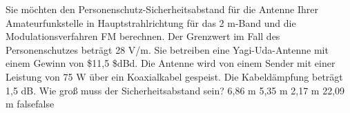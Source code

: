     {Sie möchten den Personenschutz-Sicherheitsabstand für die Antenne Ihrer Amateurfunkstelle in Hauptstrahlrichtung für das 2 m-Band und die Modulationsverfahren FM berechnen. Der Grenzwert im Fall des Personenschutzes beträgt 28 V/m. Sie betreiben eine Yagi-Uda-Antenne mit einem Gewinn von \$11,5 \$dBd. Die Antenne wird von einem Sender mit einer Leistung von 75 W über ein Koaxialkabel gespeist. Die Kabeldämpfung beträgt 1,5 dB. Wie groß muss der Sicherheitsabstand sein?}
    {6,86 m}
    {5,35 m}
    {2,17 m}
    {22,09 m}
    {false}{false}